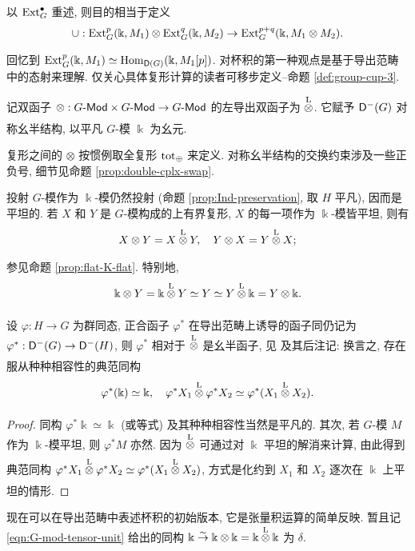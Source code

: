 以 $\operatorname{Ext}_G^\bullet$ 重述, 则目的相当于定义
\[ \cup: \operatorname{Ext}^p_G(\Bbbk, M_1) \otimes \operatorname{Ext}^q_G(\Bbbk, M_2) \to \operatorname{Ext}_G^{p+q}(\Bbbk, M_1 \otimes M_2). \]

回忆到 $\operatorname{Ext}^p_G(\Bbbk, M_1) \simeq \operatorname{Hom}_{\mathsf{D}(G)}(\Bbbk, M_1[p])$. 对杯积的第一种观点是基于导出范畴中的态射来理解. 仅关心具体复形计算的读者可移步定义--命题 \ref{def:group-cup-3}.

\begin{definition}
	记双函子 $\otimes: G\text{-}\mathsf{Mod} \times G\text{-}\mathsf{Mod} \to G\text{-}\mathsf{Mod}$ 的左导出双函子为 $\underset{}{\overset{\mathrm{L}}{\otimes}}$. 它赋予 $\mathsf{D}^-(G)$ 对称幺半结构, 以平凡 $G$-模 $\Bbbk$ 为幺元.
\end{definition}

复形之间的 $\otimes$ 按惯例取全复形 $\operatorname{tot}_{\oplus}$ 来定义. 对称幺半结构的交换约束涉及一些正负号, 细节见命题 \ref{prop:double-cplx-swap}.

投射 $G$-模作为 $\Bbbk$-模仍然投射 (命题 \ref{prop:Ind-preservation}, 取 $H$ 平凡), 因而是平坦的. 若 $X$ 和 $Y$ 是 $G$-模构成的上有界复形, $X$ 的每一项作为 $\Bbbk$-模皆平坦, 则有
\[ X \otimes Y = X \underset{}{\overset{\mathrm{L}}{\otimes}} Y, \quad Y \otimes X = Y \underset{}{\overset{\mathrm{L}}{\otimes}} X; \]
参见命题 \ref{prop:flat-K-flat}. 特别地,
\begin{equation}\label{eqn:G-mod-tensor-unit}
	\Bbbk \otimes Y = \Bbbk \underset{}{\overset{\mathrm{L}}{\otimes}} Y \simeq Y \simeq Y \underset{}{\overset{\mathrm{L}}{\otimes}} \Bbbk = Y \otimes \Bbbk.
\end{equation}

\begin{lemma}\label{prop:group-pullback-monoidal}
	设 $\varphi: H \to G$ 为群同态, 正合函子 $\varphi^*$ 在导出范畴上诱导的函子同仍记为 $\varphi^*: \mathsf{D}^-(G) \to \mathsf{D}^-(H)$, 则 $\varphi^*$ 相对于 $\underset{}{\overset{\mathrm{L}}{\otimes}}$ 是幺半函子, 见 \cite[定义 3.1.7]{Li1} 及其后注记: 换言之, 存在服从种种相容性的典范同构
	\[ \varphi^*(\Bbbk) \simeq \Bbbk, \quad \varphi^* X_1 \underset{}{\overset{\mathrm{L}}{\otimes}} \varphi^* X_2 \simeq \varphi^* (X_1 \underset{}{\overset{\mathrm{L}}{\otimes}} X_2). \]
\end{lemma}
\begin{proof}
	同构 $\varphi^* \Bbbk \simeq \Bbbk$ (或等式) 及其种种相容性当然是平凡的. 其次, 若 $G$-模 $M$ 作为 $\Bbbk$-模平坦, 则 $\varphi^* M$ 亦然. 因为 $\underset{}{\overset{\mathrm{L}}{\otimes}}$ 可通过对 $\Bbbk$ 平坦的解消来计算, 由此得到典范同构 $\varphi^* X_1 \underset{}{\overset{\mathrm{L}}{\otimes}} \varphi^* X_2 \simeq \varphi^* (X_1 \underset{}{\overset{\mathrm{L}}{\otimes}} X_2)$, 方式是化约到 $X_1$ 和 $X_2$ 逐次在 $\Bbbk$ 上平坦的情形.
\end{proof}

现在可以在导出范畴中表述杯积的初始版本, 它是张量积运算的简单反映. 暂且记 \eqref{eqn:G-mod-tensor-unit} 给出的同构 $\Bbbk \stackrel{\sim}{\rightarrow} \Bbbk \otimes \Bbbk = \Bbbk \underset{}{\overset{\mathrm{L}}{\otimes}} \Bbbk$ 为 $\delta$.

